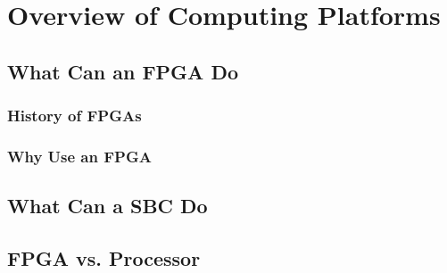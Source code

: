 \chapter{Overview of Computing Platforms}

\section{What Can an FPGA Do}
\subsection{History of FPGAs}
\subsection{Why Use an FPGA}

\section{What Can a SBC Do}
\section{FPGA vs. Processor}



